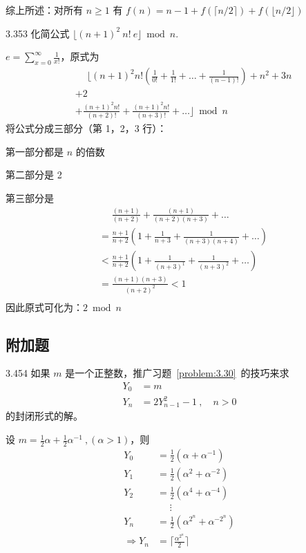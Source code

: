 综上所述：对所有 \( n \ge 1 \) 有 \( f(n) = n - 1 + f(\lceil n/2 \rceil) + f(\lfloor n/2 \rfloor) \)

\begin{problem}{3.35}{3}
  化简公式 \( \lfloor (n+1)^2 \ n! \ e \rfloor \bmod n \).
\end{problem}

\( e = \sum_{x=0}^{\infty}\frac{1}{x!} \)，原式为
\begin{align*}
  &\phantom{+} \lfloor (n+1)^2 n! (\frac{1}{0!} + \frac{1}{1!} + \dots + \frac{1}{(n-1)!}) + n^2 + 3n \\
  &+ 2 \\
  &+ \frac{(n+1)^2 n!}{(n+2)!} + \frac{(n+1)^2 n!}{(n+3)!} + \dots \rfloor \bmod n
\end{align*}
将公式分成三部分（第 1，2，3 行）：

第一部分都是 \( n \) 的倍数

第二部分是 2

第三部分是
\begin{align*}
  &\phantom{=} \frac{(n+1)}{(n+2)} + \frac{(n+1)}{(n+2)(n+3)} + \dots \\
  &= \frac{n+1}{n+2} (1 + \frac{1}{n+3} + \frac{1}{(n+3)(n+4)} + \dots) \\
  &< \frac{n+1}{n+2} (1 + \frac{1}{(n+3)^1} + \frac{1}{(n+3)^2} + \dots) \\
  &= \frac{(n+1)(n+3)}{(n+2)^2} < 1 \\
\end{align*}
因此原式可化为：\( 2 \bmod n \)

\subsection{附加题}

\begin{problem}{3.45}{4}
  如果 \( m \) 是一个正整数，推广习题~\ref{problem:3.30}~的技巧来求
  \begin{align*}
    Y_0 &= m \\
    Y_n &= 2 Y_{n-1}^2 - 1 \ , \quad n > 0
  \end{align*}
  的封闭形式的解。
\end{problem}

设 \( m = \frac{1}{2} \alpha + \frac{1}{2} \alpha^{-1} \ , (\alpha > 1) \)，则
\begin{align*}
  Y_0 &= \frac{1}{2} (\alpha + \alpha^{-1}) \\
  Y_1 &= \frac{1}{2} (\alpha^2 + \alpha^{-2}) \\
  Y_2 &= \frac{1}{2} (\alpha^4 + \alpha^{-4}) \\
  &\phantom{=} \vdots \\
  Y_n &= \frac{1}{2} (\alpha^{2^n} + \alpha^{-2^n}) \\
  \Rightarrow Y_n & = \lceil \frac{\alpha^{2^n}}{2} \rceil
\end{align*}
